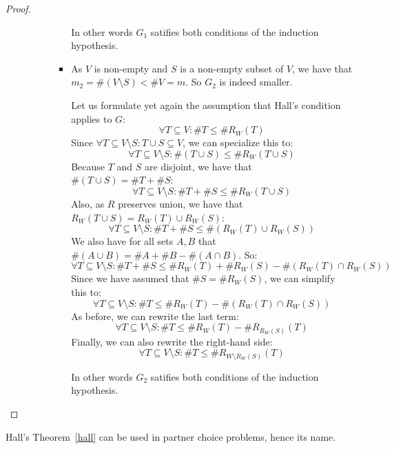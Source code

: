 \begin{proof}
\begin{itemize}
\begin{itemize}
\begin{itemize}
\begin{itemize}
In other words $G_1$ satifies both conditions of
the induction hypothesis.

\item[\dotuline{$G_2$:}]
As $V$ is non-empty and $S$ is a non-empty subset of $V$, we have that $m_2 =
\#(V \setminus S) < \#V = m$. So $G_2$ is indeed smaller.

Let us formulate yet again the assumption that Hall's condition applies to $G$:
\[ \forall T \subseteq V: \#T \leq \#R_W(T) \]
Since $\forall T \subseteq V\setminus S: T \cup S \subseteq V$, we can specialize this to:
\[ \forall T \subseteq V \setminus S: \#(T \cup S) \leq \#R_W(T \cup S) \]
Because $T$ and $S$ are disjoint, we have that $\#(T \cup S) = \#T + \#S$:
\[ \forall T \subseteq V \setminus S: \#T + \#S \leq \#R_W(T \cup S) \]
Also, as $R$ preserves union, we have that $R_W(T \cup S) = R_W(T) \cup R_W(S)$:
\[ \forall T \subseteq V \setminus S: \#T + \#S \leq \#(R_W(T) \cup R_W(S)) \]
We also have for all sets $A, B$ that $\#(A \cup B) = \#A + \#B - \#(A \cap B)$.
So:
\[ \forall T \subseteq V \setminus S: \#T + \#S \leq \#R_W(T) + \#R_W(S) - \#(R_W(T) \cap R_W(S)) \]
Since we have assumed that $\#S = \#R_W(S)$, we can simplify this to:
\[ \forall T \subseteq V \setminus S: \#T \leq \#R_W(T) - \#(R_W(T) \cap R_W(S)) \]
As before, we can rewrite the last term:
\[ \forall T \subseteq V \setminus S: \#T \leq \#R_W(T) - \#R_{R_W(S)}(T) \]
Finally, we can also rewrite the right-hand side:
\[ \forall T \subseteq V \setminus S: \#T \leq \#R_{W \setminus R_W(S)}(T) \]

In other words $G_2$ satifies both conditions of
the induction hypothesis.

\end{itemize}
\end{itemize}
\end{itemize}

\end{itemize}
\end{proof}
Hall's Theorem~\ref{hall} can be used in partner choice problems, hence its name.

